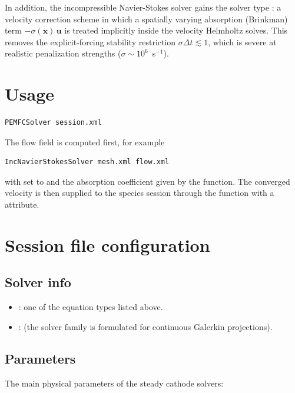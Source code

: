 In addition, the incompressible Navier-Stokes solver gains the
solver type : a velocity correction
scheme in which a spatially varying absorption (Brinkman) term
$-\sigma(\mathbf{x})\,\mathbf{u}$ is treated implicitly inside the
velocity Helmholtz solves. This removes the explicit-forcing
stability restriction $\sigma \Delta t \lesssim 1$, which is severe
at realistic penalization strengths ($\sigma \sim 10^6$~s$^{-1}$).

\section{Usage}

\begin{lstlisting}[style=BashInputStyle]
PEMFCSolver session.xml
\end{lstlisting}

The flow field is computed first, for example
\begin{lstlisting}[style=BashInputStyle]
IncNavierStokesSolver mesh.xml flow.xml
\end{lstlisting}
with  set to  and the
absorption coefficient given by the 
function. The converged velocity is then supplied to the species
session through the  function with a
 attribute.

\section{Session file configuration}

\subsection{Solver info}

\begin{itemize}
\item {}: one of the equation types listed above.
\item {}:  (the solver family is
formulated for continuous Galerkin projections).
\end{itemize}

\subsection{Parameters}

The main physical parameters of the steady cathode solvers:

